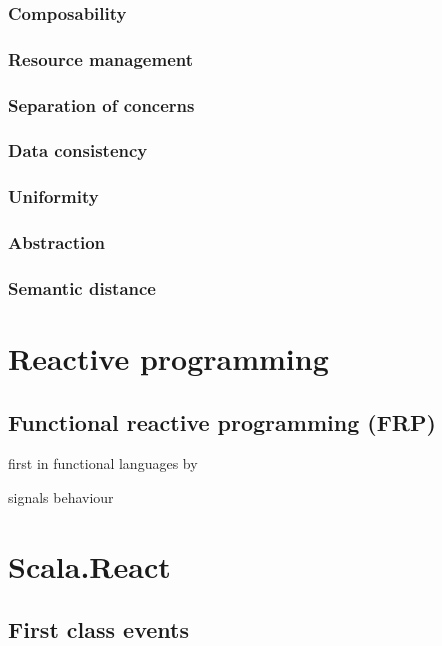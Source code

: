 \documentclass[format=acmtog]{acmart}
\begin{document}
		\subsubsection{Composability}

		\subsubsection{Resource management}

		\subsubsection{Separation of concerns}

		\subsubsection{Data consistency}

		\subsubsection{Uniformity}

		\subsubsection{Abstraction}

		\subsubsection{Semantic distance}

\section{Reactive programming}

	\subsection{Functional reactive programming (FRP)}

		first in functional languages by~\cite{Elliott}

		signals behaviour~\cite{Bainomugisha:2013}
	

\section{Scala.React}

	\subsection{First class events}
\end{document}
